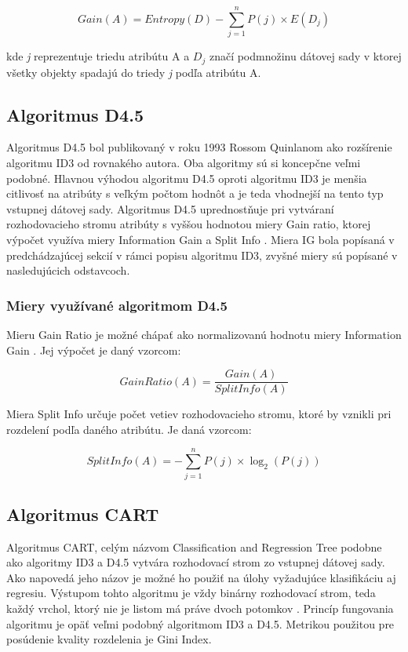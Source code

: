 \documentclass[slovak, master]{diploma}
\begin{document}
\[Gain(A) = Entropy(D) - \displaystyle\sum\limits_{j=1}^n P(j) \times E(D_j)\]

kde \textit{j} reprezentuje triedu atribútu A a $D_j$ značí podmnožinu dátovej sady v ktorej všetky objekty spadajú do triedy \textit{j} podľa atribútu A.

\subsection{Algoritmus D4.5}
\label{sec:D45}
Algoritmus D4.5 bol publikovaný v roku 1993 Rossom Quinlanom ako rozšírenie algoritmu ID3 od rovnakého autora. Oba algoritmy sú si koncepčne veľmi podobné. Hlavnou výhodou algoritmu D4.5 oproti algoritmu ID3 je menšia citlivosť na atribúty s veľkým počtom hodnôt a je teda vhodnejší na tento typ vstupnej dátovej sady. Algoritmus D4.5 uprednostňuje pri vytváraní rozhodovacieho stromu atribúty s vyššou hodnotou miery Gain ratio, ktorej výpočet využíva miery Information Gain a Split Info \cite{hssina2014comparative}. Miera IG bola popísaná v predchádzajúcej sekcií v rámci popisu algoritmu ID3, zvyšné miery sú popísané v nasledujúcich odstavcoch.

\subsubsection*{Miery využívané algoritmom D4.5}
\label{sec:D45miery}
Mieru Gain Ratio je možné chápať ako normalizovanú hodnotu miery Information Gain \cite{hssina2014comparative}. Jej výpočet je daný vzorcom:

\[GainRatio(A) = \frac{Gain(A)}{SplitInfo(A)}\]

Miera Split Info určuje počet vetiev rozhodovacieho stromu, ktoré by vznikli pri rozdelení podľa daného atribútu. Je daná vzorcom:

\[SplitInfo(A) = - \displaystyle\sum\limits_{j=1}^n P(j) \times \log_2(P(j))\]

\subsection{Algoritmus CART}
\label{sec:CART}
Algoritmus CART, celým názvom Classification and Regression Tree podobne ako algoritmy ID3 a D4.5 vytvára rozhodovací strom zo vstupnej dátovej sady. Ako napovedá jeho názov je možné ho použiť na úlohy vyžadujúce klasifikáciu aj regresiu. Výstupom tohto algoritmu je vždy binárny rozhodovací strom, teda každý vrchol, ktorý nie je listom má práve dvoch potomkov \cite{CART}. Princíp fungovania algoritmu je opäť veľmi podobný algoritmom ID3 a D4.5. Metrikou použitou pre posúdenie kvality rozdelenia je Gini Index.
\end{document}
